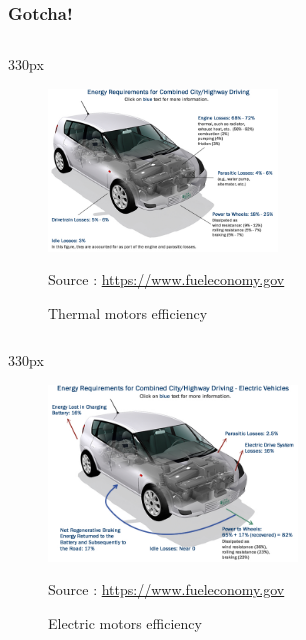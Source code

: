 \begin{frame}
\frametitle{Gotcha!}
\begin{center}
\begin{columns}
\begin{column}{330px}
{
    \begin{figure}[h!]
        \centering
        \includegraphics[width=230px]
            {images/efficiency-thermal-motors.jpg}
        \vspace{-0.5em}
        \caption{Thermal motors efficiency}
        \vspace{-0.3em}
        \scriptsize{Source :
            \url{https://www.fueleconomy.gov}}
    \end{figure}
}
\end{column}
\end{columns}
\end{center}
\end{frame}


\begin{frame}
\begin{center}
\begin{columns}
\begin{column}{330px}
{
    \begin{figure}[h!]
        \centering
        \includegraphics[width=250px]
            {images/efficiency-electric-motors.jpg}
        \vspace{-0.5em}
        \caption{Electric motors efficiency}
        \vspace{-0.3em}
        \scriptsize{Source :
            \url{https://www.fueleconomy.gov}}
    \end{figure}
}
\end{column}
\end{columns}
\end{center}
\end{frame}



